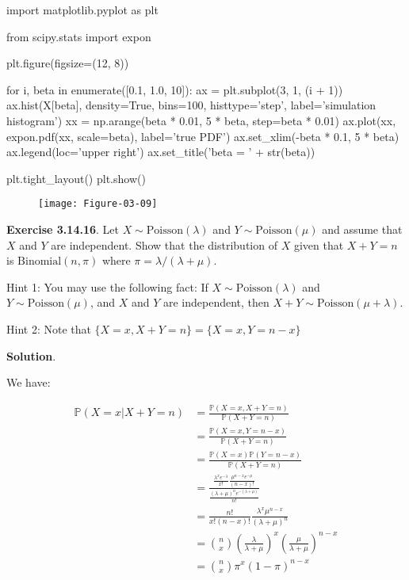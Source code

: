 \begin{python}
import matplotlib.pyplot as plt

from scipy.stats import expon

plt.figure(figsize=(12, 8))

for i, beta in enumerate([0.1, 1.0, 10]):
    ax = plt.subplot(3, 1, (i + 1))
    ax.hist(X[beta], density=True, bins=100, histtype='step', label='simulation histogram')
    xx = np.arange(beta * 0.01, 5 * beta, step=beta * 0.01)
    ax.plot(xx, expon.pdf(xx, scale=beta), label='true PDF')
    ax.set_xlim(-beta * 0.1, 5 * beta)
    ax.legend(loc='upper right')
    ax.set_title('beta = ' + str(beta))
    
plt.tight_layout()
plt.show()
\end{python}

\begin{figure}[H]
\texttt{[image: Figure-03-09]}
\end{figure}

\textbf{Exercise 3.14.16}. Let \(X \sim \text{Poisson}(\lambda)\) and
\(Y \sim \text{Poisson}(\mu)\) and assume that \(X\) and \(Y\) are
independent. Show that the distribution of \(X\) given that
\(X + Y = n\) is \(\text{Binomial}(n, \pi)\) where
\(\pi = \lambda / (\lambda + \mu)\).

Hint 1: You may use the following fact: If
\(X \sim \text{Poisson}(\lambda)\) and \(Y \sim \text{Poisson}(\mu)\),
and \(X\) and \(Y\) are independent, then
\(X + Y \sim \text{Poisson}(\mu + \lambda)\).

Hint 2: Note that \(\{X = x, X + Y = n\} = \{X = x, Y = n - x \}\)

\textbf{Solution}.

We have:

\begin{align}
\mathbb{P}(X = x | X + Y = n) &= \frac{\mathbb{P}(X = x, X + Y = n)}{\mathbb{P}(X + Y = n)} \\
&= \frac{\mathbb{P}(X = x, Y = n - x)}{\mathbb{P}(X + Y = n)} \\
&= \frac{\mathbb{P}(X = x) \mathbb{P}(Y = n - x)}{\mathbb{P}(X + Y = n)} \\
&= \frac{\frac{\lambda^x e^{-\lambda}}{x!} \frac{\mu^{n - x} e^{-\mu}}{(n - x)!} }{\frac{(\lambda + \mu)^n e^{-(\lambda + \mu)}}{n!}} \\
&= \frac{n!}{x! (n - x)!} \frac{\lambda^x \mu^{n - x}}{(\lambda + \mu)^n} \\
&= \binom{n}{x} \left( \frac{\lambda}{\lambda + \mu} \right)^x \left( \frac{\mu}{\lambda + \mu}\right)^{n - x} \\
&= \binom{n}{x} \pi^x (1 - \pi)^{n - x}
\end{align}

